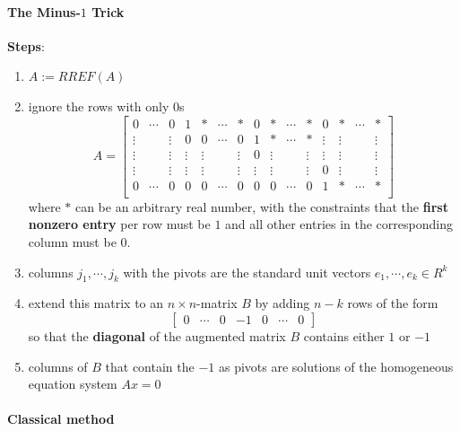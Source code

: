 \paragraph{The Minus-$1$ Trick \cite{mfml-1}}\label{Solutions of ax=0: The Minus-1 Trick}
\textbf{Steps}:
\begin{enumerate}
    \item $A := RREF(A)$

    \item ignore the rows with only 0s
    \[
        A = 
        \begin{bmatrix}
            0 & \cdots  & 0 & 1 & \ast & \cdots  & \ast & 0 & \ast & \cdots  & \ast & 0 & \ast & \cdots  & \ast\\
            \vdots && \vdots & 0 & 0 & \cdots  & 0 & 1 & \ast & \cdots  & \ast & \vdots & \vdots & & \vdots\\
            \vdots & & \vdots & \vdots & \vdots & & \vdots & 0 & \vdots & & \vdots & \vdots & \vdots && \vdots\\
            \vdots & & \vdots & \vdots & \vdots & & \vdots & \vdots & \vdots & & \vdots & 0 & \vdots && \vdots\\
            0 & \cdots & 0 & 0 & 0 & \cdots & 0 & 0 & 0 & \cdots & 0 & 1 & \ast & \cdots & \ast\\
        \end{bmatrix}
    \]
    where $\ast$ can be an arbitrary real number, with the constraints that the \textbf{first nonzero entry} per row must be $1$ and all other entries in the corresponding column must be $0$. 

    \item columns $j_1, \cdots , j_k$ with the pivots are the standard unit vectors $e_1, \cdots , e_k \in R^k$

    \item extend this matrix to an $n \times n$-matrix $B$ by adding $n - k$ rows of the form
    \[
        \begin{bmatrix}
            0 & \cdots & 0 & -1 & 0 & \cdots & 0
        \end{bmatrix}
    \]
    so that the \textbf{diagonal} of the augmented matrix $B$ contains either $1$ or $-1$

    \item columns of $B$ that contain the $-1$ as pivots are solutions of the homogeneous equation system $Ax = 0$

\end{enumerate}

\paragraph{Classical method \cite{mfml-1}}\label{Solutions of ax=0: Classical method}

